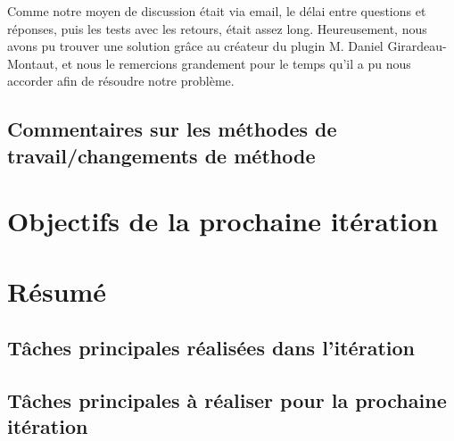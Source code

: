 \documentclass[12pt,titlepage,french]{article}
\begin{document}
Comme notre moyen de discussion était via email, le délai entre questions et réponses, puis les tests avec les retours, était assez long. Heureusement, nous avons pu trouver une solution grâce au créateur du plugin M. Daniel Girardeau-Montaut, et nous le remercions grandement pour le temps qu'il a pu nous accorder afin de résoudre notre problème.

\subsection{Commentaires sur les méthodes de travail/changements de méthode}


\section{Objectifs de la prochaine itération}


\section{Résumé}
\subsection{Tâches principales réalisées dans l'itération}

\subsection{Tâches principales à réaliser pour la prochaine itération}

\begin{thebibliography}{3}

\end{thebibliography}
\end{document}

